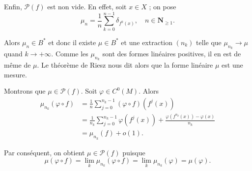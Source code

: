 \documentclass[a4paper,12pt,openany]{article}
\theoremstyle{plain}
\theoremstyle{definition}
\newcommand{\N}{\mathbf{N}}
\newcommand{\Pcal}{\mathcal{P}}
\begin{document}
\begin{enumerate}
Enfin, $\Pcal(f)$ est non vide.  En effet, soit $x \in X$ ; on pose 
$$
\mu_n = \frac{1}{n} \sum_{k=0}^{n-1} \delta_{f^k(x)}, \quad n \in \N_{\geqslant 1}.
$$

Alors $\mu_n \in B^*$ et donc il existe $\mu \in B^*$ et une extraction $(n_k)$ telle que $\mu_{n_k} \to \mu$ quand $k \to +\infty.$ Comme les $\mu_{n_k}$ sont des formes lin\'eaires positives, il en est de m\^eme de $\mu.$ Le th\'eor\`eme de Riesz nous dit alors que la forme lin\'eaire $\mu$ est une mesure.



Montrons que $\mu \in \Pcal(f)$. Soit $\varphi \in C^0(M).$ Alors 
$$
\begin{aligned}
\mu_{n_k}(\varphi \circ f) &= \frac{1}{n} \sum_{j=0}^{n_k-1}(\varphi\circ f)(f^j(x))  \\
&= \frac{1}{n_k} \sum_{j=0}^{n_k - 1} \varphi(f^j(x)) + \frac{\varphi(f^{n_k}(x)) -\varphi(x)}{n_k}  \\
&= \mu_{n_k}(f) + o(1).
\end{aligned}
$$

Par cons\'equent, on obtient $\mu \in \Pcal(f)$ puisque
$$
\mu(\varphi \circ f) = \lim_k \mu_{n_k}(\varphi \circ f) = \lim_k \mu_{n_k}(\varphi) = \mu(\varphi).
$$

\end{enumerate}
\vspace{0.6cm}

 \vspace{1.5mm} 
\end{document}

